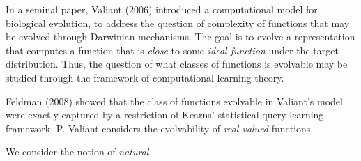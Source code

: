 In a seminal paper, Valiant (2006) introduced a computational model for
biological evolution, to address the question of complexity of functions that
may be evolved through Darwinian mechanisms. The goal is to evolve a
representation that computes a function that is \emph{close} to some \emph{ideal
function} under the target distribution. Thus, the question of what classes of
functions is evolvable may be studied through the framework of computational
learning theory.

Feldman (2008) showed that the class of functions evolvable in Valiant's model
were exactly captured by a restriction of Kearns' statistical query learning
framework. P. Valiant considers the evolvability of \emph{real-valued}
functions. 

We consider the notion of \emph{natural}
